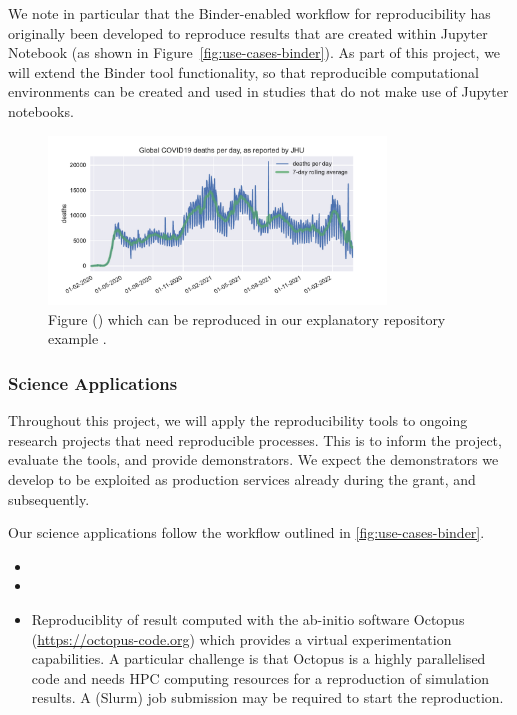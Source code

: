 We note in particular that the Binder-enabled workflow for reproducibility has
originally been developed to reproduce results that are created within Jupyter
Notebook (as shown in Figure~\ref{fig:use-cases-binder}). As part of this
project, we will extend the Binder tool functionality, so that reproducible
computational environments can be created and used in studies that do not make
use of Jupyter notebooks.

\begin{figure}
  \centering
  \includegraphics[width=0.8\textwidth]{images/figure1.pdf}
  \caption{Figure () which can be reproduced in our explanatory repository example
    \cite{ReproducibilityRepositoryExample2022}. \label{fig:reproducibility-example-covid}}
\end{figure}

\subsubsection{Science Applications}\label{sec:science-applications}
Throughout this project, we will apply the reproducibility tools to ongoing
research projects that need reproducible processes. This is to inform the
project, evaluate the tools, and provide demonstrators. We expect the
demonstrators we develop to be exploited as production services already during
the grant, and subsequently.

Our science applications follow the workflow outlined in
\ref{fig:use-cases-binder}. 
\begin{itemize}
\item {}
\item {}
\item Reproduciblity of result computed
  with the ab-initio software Octopus
  (\href{https://octopus-code.org}{https://octopus-code.org}) which provides a
  virtual experimentation capabilities. A particular challenge is that Octopus
  is a highly parallelised code and needs HPC computing resources for a
  reproduction of simulation results. A (Slurm) job submission may be required
  to start the reproduction.
\end{itemize}


